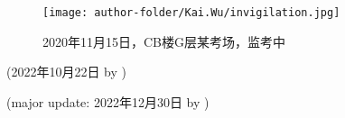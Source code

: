 \begin{figure}[H]
    \centering
    \texttt{[image: author-folder/Kai.Wu/invigilation.jpg]}
    \caption{2020年11月15日，CB楼G层某考场，监考中}
\end{figure}

\begin{flushright}
(2022年10月22日 by \Wu)

(major update: 2022年12月30日 by \Yue)
\end{flushright}





% 
